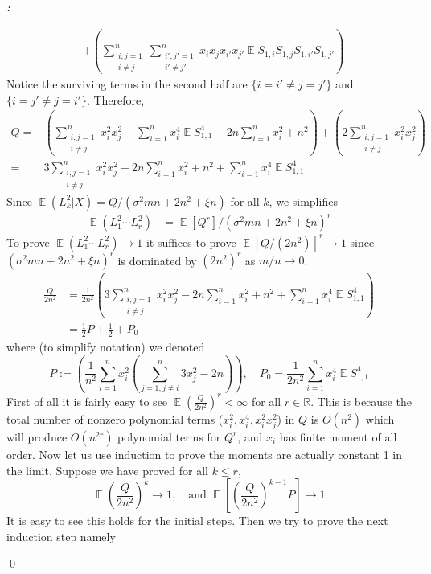 \documentclass[12pt]{extarticle}
\renewenvironment{proof}[1][\proofname]{ { \it\bfseries #1: }}{\qed}
\newcommand{\field}[1]{\mathbb{#1}}
\newcommand{\R}{\field{R}}
\newcommand{\1}{\field{1}}
\DeclareMathOperator{\E}{\mathbb{E}}
\numberwithin{equation}{section}
\begin{document}
\begin{proof}
\begin{enumerate}[label={(\arabic*)}]
\begin{align*}
  & +  \left( \sum_{\substack{i,j=1\\i\ne j}}^n\sum_{\substack{i',j'=1\\i'\ne j'}}^n x_ix_jx_{i'}x_{j'} \E S_{1,i} S_{1,j} S_{1,i'} S_{1,j'}  \right)
\end{align*}
Notice the surviving terms in the second half are $\{i=i'\ne j=j' \}$ and $\{i=j'\ne j=i' \}$. Therefore, 
\begin{align*}
 Q = & \left(   \sum_{\substack{i,j=1\\i\ne j}}^n x_i^2x_j^2 +  \sum_{i=1}^n x_i^4\E S_{1,1}^4 - 2n \sum_{i=1}^n x_i^2 + n^2 \right) 
   +  \left( 2 \sum_{\substack{i,j=1\\i\ne j}}^n x_i^2 x_j^2  \right) \\
  = & 3\sum_{\substack{i,j=1\\i\ne j}}^n x_i^2x_j^2 - 2n \sum_{i=1}^n x_i^2 + n^2 + \sum_{i=1}^n x_i^4\E S_{1,1}^4 
\end{align*}
Since $\E(L_k^2|X)=Q/({\sigma^2 mn+2n^2 + \xi n} )$ for all $k$, we simplifies 
\begin{align*}
    \E (L_{1}^{2} \cdots L_{r}^{2}) 
  & = \E \left[ Q^r\right] /({\sigma^2 mn+2n^2 + \xi n} )^r
\end{align*}
To prove $\E (L_{1}^{2} \cdots L_{r}^{2}) \to 1$ it suffices to prove $\E \left[ Q / (2n^2)\right]^r \to 1 $ since $({\sigma^2 mn+2n^2 + \xi n} )^r$ is dominated by $(2n^2)^r$ as $m/n \to 0$.
\begin{align*}
    \frac{Q}{2n^2} & =  \frac{1}{{2n^2} }({3\sum_{\substack{i,j=1\\i\ne j}}^n x_i^2x_j^2 - 2n \sum_{i=1}^n x_i^2 + n^2 + \sum_{i=1}^n x_i^4\E S_{1,1}^4 } ) \\
& = \frac{1}{2}P +\frac{1}{2} + P_0
\end{align*}
where (to simplify notation) we denoted
\[
P := \left(\frac{1}{n^2}\sum_{i=1}^n x_i^2 (\sum_{j=1, j\ne i}^n  3x_j^2-2n)\right) ,\quad P_0 = \frac{1}{{2n^2}}\sum_{i=1}^n x_i^4\E S_{1,1}^4 
\]
First of all it is fairly easy to see $\E \left(\frac{Q}{2n^2} \right)^r<\infty$ for all $r\in \R$. This is because the total number of nonzero polynomial terms ($x_i^2, x_i^4, x_i^2x_j^2$) in $Q$ is $O(n^2)$ which will produce $O(n^{2r})$ polynomial terms for $Q^r$, and  $x_i$ has finite moment of all order. Now let us use induction to prove the moments are actually constant 1 in the limit. Suppose we have proved for all $k\le r$,
\[
\E \left(\frac{Q}{2n^2} \right)^k  \to 1, \quad \text{and } \E \left[ \left(\frac{Q}{2n^2} \right)^{k-1} P \right] \to 1
\]
It is easy to see this holds for the initial steps. Then we try to prove the next induction step namely 

\end{enumerate}
\end{proof}
\end{document}
